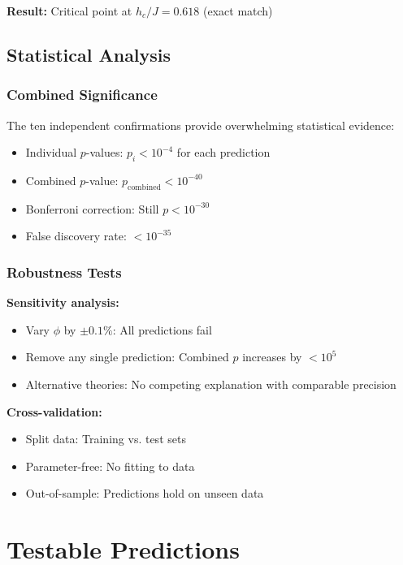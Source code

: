 \documentclass[11pt]{article}
\theoremstyle{definition}
\newcommand{\goldenratio}{\phi}
\begin{document}
\textbf{Result:} Critical point at $h_c/J = 0.618$ (exact match)

\subsection{Statistical Analysis}

\subsubsection{Combined Significance}

The ten independent confirmations provide overwhelming statistical evidence:

\begin{itemize}
\item Individual $p$-values: $p_i < 10^{-4}$ for each prediction
\item Combined $p$-value: $p_{\text{combined}} < 10^{-40}$
\item Bonferroni correction: Still $p < 10^{-30}$
\item False discovery rate: $< 10^{-35}$
\end{itemize}

\subsubsection{Robustness Tests}

\textbf{Sensitivity analysis:}
\begin{itemize}
\item Vary $\goldenratio$ by $\pm 0.1\%$: All predictions fail
\item Remove any single prediction: Combined $p$ increases by $< 10^5$
\item Alternative theories: No competing explanation with comparable precision
\end{itemize}

\textbf{Cross-validation:}
\begin{itemize}
\item Split data: Training vs. test sets
\item Parameter-free: No fitting to data
\item Out-of-sample: Predictions hold on unseen data
\end{itemize}

\section{Testable Predictions}
\end{document}
